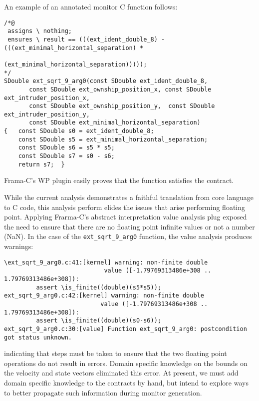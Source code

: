 An example of an annotated monitor C function follows: 

\begin{Verbatim}[fontsize=\scriptsize]
/*@
 assigns \ nothing;
 ensures \ result == (((ext_ident_double_8) - (((ext_minimal_horizontal_separation) *
                                 (ext_minimal_horizontal_separation)))));
*/
SDouble ext_sqrt_9_arg0(const SDouble ext_ident_double_8,
       const SDouble ext_ownship_position_x, const SDouble ext_intruder_position_x,
       const SDouble ext_ownship_position_y,  const SDouble ext_intruder_position_y,
       const SDouble ext_minimal_horizontal_separation)
{   const SDouble s0 = ext_ident_double_8;
    const SDouble s5 = ext_minimal_horizontal_separation;
    const SDouble s6 = s5 * s5;
    const SDouble s7 = s0 - s6;
    return s7;  }
\end{Verbatim}

\noindent
Frama-C's WP plugin easily proves that the function satisfies the
contract. 

While the current analysis demonstrates a faithful translation from
core language to C code, this analysis perform elides the issues that
arise performing floating point. Applying Frarma-C's abstract
interpretation value analysis plug exposed the need to ensure that
there are no floating point infinite values  or not a number (NaN).
In the case of the \texttt{ext\_sqrt\_9\_arg0} function, the value
analysis produces warnings:
\begin{Verbatim}[fontsize=\scriptsize]
\ext_sqrt_9_arg0.c:41:[kernel] warning: non-finite double 
                            value ([-1.79769313486e+308 .. 1.79769313486e+308]):
         assert \is_finite((double)(s5*s5));
ext_sqrt_9_arg0.c:42:[kernel] warning: non-finite double
                           value ([-1.79769313486e+308 .. 1.79769313486e+308]):
         assert \is_finite((double)(s0-s6));
ext_sqrt_9_arg0.c:30:[value] Function ext_sqrt_9_arg0: postcondition got status unknown.
\end{Verbatim}
indicating that steps must be taken to ensure that the two floating
point operations do not result in errors.  Domain specific knowledge
on the  bounds on the velocity and state vectors  eliminated this
error.  At present, we must add domain specific knowledge to the
contracts by hand, but intend to explore ways to better propagate such
information during monitor generation.  

